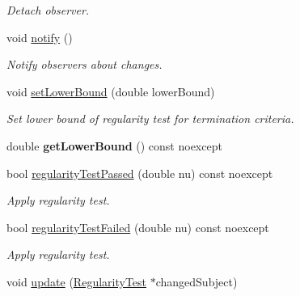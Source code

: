 \begin{DoxyCompactItemize}
\begin{DoxyCompactList}\small\item\em Detach observer. \end{DoxyCompactList}\item 
void \hyperlink{classSpacy_1_1Mixin_1_1MixinConnection_a1ddeaa78a3bb4a38c2cca36d1f99fe36}{notify} ()\hypertarget{classSpacy_1_1Mixin_1_1MixinConnection_a1ddeaa78a3bb4a38c2cca36d1f99fe36}{}\label{classSpacy_1_1Mixin_1_1MixinConnection_a1ddeaa78a3bb4a38c2cca36d1f99fe36}

\begin{DoxyCompactList}\small\item\em Notify observers about changes. \end{DoxyCompactList}\item 
void \hyperlink{classSpacy_1_1Mixin_1_1RegularityTest_a29ae1c15b8447601c2a783352e01bde2}{set\+Lower\+Bound} (double lower\+Bound)\hypertarget{classSpacy_1_1Mixin_1_1RegularityTest_a29ae1c15b8447601c2a783352e01bde2}{}\label{classSpacy_1_1Mixin_1_1RegularityTest_a29ae1c15b8447601c2a783352e01bde2}

\begin{DoxyCompactList}\small\item\em Set lower bound of regularity test for termination criteria. \end{DoxyCompactList}\item 
double {\bfseries get\+Lower\+Bound} () const noexcept\hypertarget{classSpacy_1_1Mixin_1_1RegularityTest_abc194f9b2150b6f02622867f673df4df}{}\label{classSpacy_1_1Mixin_1_1RegularityTest_abc194f9b2150b6f02622867f673df4df}

\item 
bool \hyperlink{classSpacy_1_1Mixin_1_1RegularityTest_a606383e629ebc0e84dc1cb6796aeeae1}{regularity\+Test\+Passed} (double nu) const noexcept
\begin{DoxyCompactList}\small\item\em Apply regularity test. \end{DoxyCompactList}\item 
bool \hyperlink{classSpacy_1_1Mixin_1_1RegularityTest_ac16e5fb18f3b591da58e32b821345f3d}{regularity\+Test\+Failed} (double nu) const noexcept
\begin{DoxyCompactList}\small\item\em Apply regularity test. \end{DoxyCompactList}\item 
void \hyperlink{classSpacy_1_1Mixin_1_1RegularityTest_a1a6191e20f84025cec8b10ec63ab94ac}{update} (\hyperlink{classSpacy_1_1Mixin_1_1RegularityTest_a89c4ffe9b8891c1f81d57e84141a2ef6}{Regularity\+Test} $\ast$changed\+Subject)\hypertarget{classSpacy_1_1Mixin_1_1RegularityTest_a1a6191e20f84025cec8b10ec63ab94ac}{}\label{classSpacy_1_1Mixin_1_1RegularityTest_a1a6191e20f84025cec8b10ec63ab94ac}


\end{DoxyCompactItemize}
